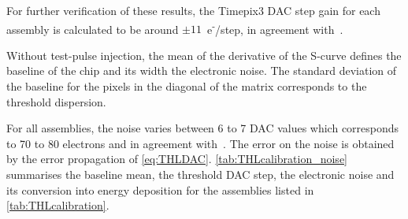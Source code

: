 For further verification of these results, the Timepix3 DAC step gain
for each assembly is calculated to be around
$\pm11$~e\textsuperscript{-}/step, in agreement
with~\cite{Timepix3Poikela}.

Without test-pulse injection, the mean of the derivative of the
S-curve defines the baseline of the chip and its width the electronic
noise. The standard deviation of the baseline for the pixels in the
diagonal of the matrix corresponds to the threshold dispersion.

For all assemblies, the noise varies between 6 to 7 DAC values which
corresponds to 70 to 80 electrons and in agreement
with~\cite{Timepix3Poikela}. The error on the noise is obtained by the
error propagation of \cref{eq:THLDAC}. \cref{tab:THLcalibration_noise}
summarises the baseline mean, the threshold DAC step, the electronic
noise and its conversion into energy deposition for the assemblies
listed in \cref{tab:THLcalibration}.



\begin{table}[htbp]
  \centering
  \caption{Measured baseline mean, threshold DAC step gain, the electronic noise
    and its conversion into energy deposition.}
  \label{tab:THLcalibration_noise}
\end{table}


